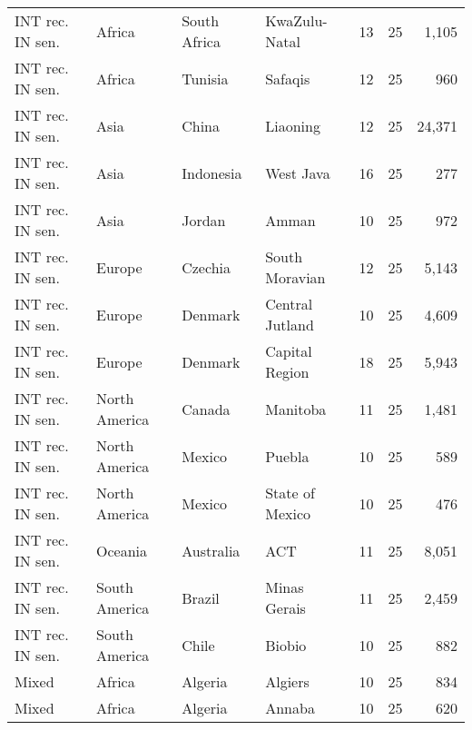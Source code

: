 \begin{tabular}{llllrrr}
 INT rec. IN sen. & Africa        & South Africa           & KwaZulu-Natal      &             13 &          25 &        1,105 \\
 INT rec. IN sen. & Africa        & Tunisia                & Safaqis            &             12 &          25 &          960 \\
 INT rec. IN sen. & Asia          & China                  & Liaoning           &             12 &          25 &       24,371 \\
 INT rec. IN sen. & Asia          & Indonesia              & West Java          &             16 &          25 &          277 \\
 INT rec. IN sen. & Asia          & Jordan                 & Amman              &             10 &          25 &          972 \\
 INT rec. IN sen. & Europe        & Czechia                & South Moravian     &             12 &          25 &        5,143 \\
 INT rec. IN sen. & Europe        & Denmark                & Central Jutland    &             10 &          25 &        4,609 \\
 INT rec. IN sen. & Europe        & Denmark                & Capital Region     &             18 &          25 &        5,943 \\
 INT rec. IN sen. & North America & Canada                 & Manitoba           &             11 &          25 &        1,481 \\
 INT rec. IN sen. & North America & Mexico                 & Puebla             &             10 &          25 &          589 \\
 INT rec. IN sen. & North America & Mexico                 & State of Mexico    &             10 &          25 &          476 \\
 INT rec. IN sen. & Oceania       & Australia              & ACT                &             11 &          25 &        8,051 \\
 INT rec. IN sen. & South America & Brazil                 & Minas Gerais       &             11 &          25 &        2,459 \\
 INT rec. IN sen. & South America & Chile                  & Biobio             &             10 &          25 &          882 \\
 Mixed            & Africa        & Algeria                & Algiers            &             10 &          25 &          834 \\
 Mixed            & Africa        & Algeria                & Annaba             &             10 &          25 &          620 \\

\end{tabular}
